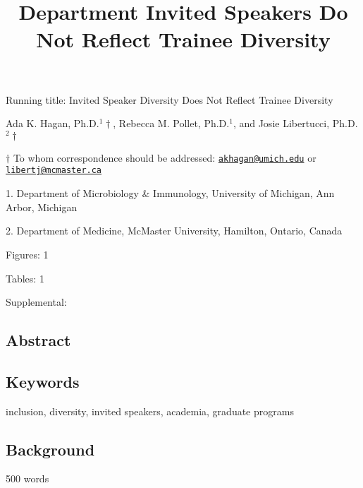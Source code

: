 \documentclass[10pt,]{article}
\title{\textbf{Department Invited Speakers Do Not Reflect Trainee Diversity}}
\author{}
\date{}
\begin{document}
\maketitle

\vspace{30mm}

Running title: Invited Speaker Diversity Does Not Reflect Trainee
Diversity

\vspace{35mm}

Ada K. Hagan, Ph.D.\({^1\dagger}\), Rebecca M. Pollet, Ph.D.\({^1}\),
and Josie Libertucci, Ph.D.\({^2\dagger}\)

\vspace{35mm}

\(\dagger\) To whom correspondence should be addressed:
\href{mailto:akhagan@umich.edu}{\nolinkurl{akhagan@umich.edu}} or
\href{mailto:libertj@mcmaster.ca}{\nolinkurl{libertj@mcmaster.ca}}

1. Department of Microbiology \& Immunology, University of Michigan, Ann
Arbor, Michigan

2. Department of Medicine, McMaster University, Hamilton, Ontario,
Canada

Figures: 1

Tables: 1

Supplemental:

\newpage

\linenumbers

\subsection{Abstract}\label{abstract}

\subsection{Keywords}\label{keywords}

inclusion, diversity, invited speakers, academia, graduate programs

\newpage

\subsection{Background}\label{background}

500 words
\end{document}
